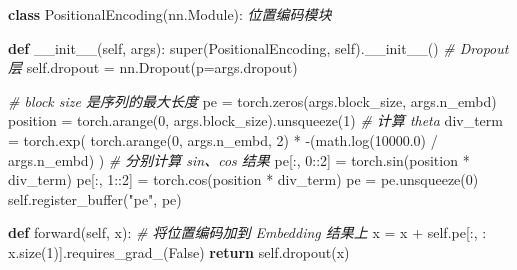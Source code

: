 \documentclass[
]{article}
\newenvironment{Shaded}{}{}
\newcommand{\BuiltInTok}[1]{\textcolor[rgb]{0.00,0.50,0.00}{#1}}
\newcommand{\CommentTok}[1]{\textcolor[rgb]{0.38,0.63,0.69}{\textit{#1}}}
\newcommand{\ControlFlowTok}[1]{\textcolor[rgb]{0.00,0.44,0.13}{\textbf{#1}}}
\newcommand{\DecValTok}[1]{\textcolor[rgb]{0.25,0.63,0.44}{#1}}
\newcommand{\FloatTok}[1]{\textcolor[rgb]{0.25,0.63,0.44}{#1}}
\newcommand{\FunctionTok}[1]{\textcolor[rgb]{0.02,0.16,0.49}{#1}}
\newcommand{\KeywordTok}[1]{\textcolor[rgb]{0.00,0.44,0.13}{\textbf{#1}}}
\newcommand{\NormalTok}[1]{#1}
\newcommand{\OperatorTok}[1]{\textcolor[rgb]{0.40,0.40,0.40}{#1}}
\newcommand{\StringTok}[1]{\textcolor[rgb]{0.25,0.44,0.63}{#1}}
\newcommand{\VariableTok}[1]{\textcolor[rgb]{0.10,0.09,0.49}{#1}}
\begin{document}
\begin{Shaded}
\begin{Highlighting}[]

\KeywordTok{class}\NormalTok{ PositionalEncoding(nn.Module):}
    \CommentTok{\textquotesingle{}\textquotesingle{}\textquotesingle{}位置编码模块\textquotesingle{}\textquotesingle{}\textquotesingle{}}

    \KeywordTok{def} \FunctionTok{\_\_init\_\_}\NormalTok{(}\VariableTok{self}\NormalTok{, args):}
        \BuiltInTok{super}\NormalTok{(PositionalEncoding, }\VariableTok{self}\NormalTok{).}\FunctionTok{\_\_init\_\_}\NormalTok{()}
        \CommentTok{\# Dropout 层}
        \VariableTok{self}\NormalTok{.dropout }\OperatorTok{=}\NormalTok{ nn.Dropout(p}\OperatorTok{=}\NormalTok{args.dropout)}

        \CommentTok{\# block size 是序列的最大长度}
\NormalTok{        pe }\OperatorTok{=}\NormalTok{ torch.zeros(args.block\_size, args.n\_embd)}
\NormalTok{        position }\OperatorTok{=}\NormalTok{ torch.arange(}\DecValTok{0}\NormalTok{, args.block\_size).unsqueeze(}\DecValTok{1}\NormalTok{)}
        \CommentTok{\# 计算 theta}
\NormalTok{        div\_term }\OperatorTok{=}\NormalTok{ torch.exp(}
\NormalTok{            torch.arange(}\DecValTok{0}\NormalTok{, args.n\_embd, }\DecValTok{2}\NormalTok{) }\OperatorTok{*} \OperatorTok{{-}}\NormalTok{(math.log(}\FloatTok{10000.0}\NormalTok{) }\OperatorTok{/}\NormalTok{ args.n\_embd)}
\NormalTok{        )}
        \CommentTok{\# 分别计算 sin、cos 结果}
\NormalTok{        pe[:, }\DecValTok{0}\NormalTok{::}\DecValTok{2}\NormalTok{] }\OperatorTok{=}\NormalTok{ torch.sin(position }\OperatorTok{*}\NormalTok{ div\_term)}
\NormalTok{        pe[:, }\DecValTok{1}\NormalTok{::}\DecValTok{2}\NormalTok{] }\OperatorTok{=}\NormalTok{ torch.cos(position }\OperatorTok{*}\NormalTok{ div\_term)}
\NormalTok{        pe }\OperatorTok{=}\NormalTok{ pe.unsqueeze(}\DecValTok{0}\NormalTok{)}
        \VariableTok{self}\NormalTok{.register\_buffer(}\StringTok{"pe"}\NormalTok{, pe)}

    \KeywordTok{def}\NormalTok{ forward(}\VariableTok{self}\NormalTok{, x):}
        \CommentTok{\# 将位置编码加到 Embedding 结果上}
\NormalTok{        x }\OperatorTok{=}\NormalTok{ x }\OperatorTok{+} \VariableTok{self}\NormalTok{.pe[:, : x.size(}\DecValTok{1}\NormalTok{)].requires\_grad\_(}\VariableTok{False}\NormalTok{)}
        \ControlFlowTok{return} \VariableTok{self}\NormalTok{.dropout(x)}
\end{Highlighting}
\end{Shaded}
\end{document}
